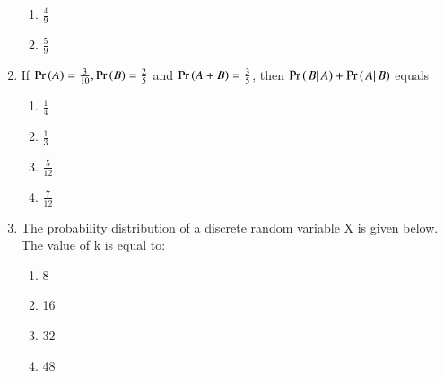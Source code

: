 \begin{enumerate}[label=\thesection.\arabic*,ref=\thesection.\theenumi]
\begin{enumerate}[label=(\alph*)]
\item $\frac{4}{9}$
\item $\frac{5}{9}$
\end{enumerate}

\item If $\Pr\left(A\right) = \frac{3}{10}, \Pr\left(B\right) = \frac{2}{5}$ and $\Pr\left(A+B\right) = \frac{3}{5}$, then $\Pr\left(\left. B \right| A\right) + \Pr\left(\left. A \right| B\right) $ equals
\begin{enumerate}
	\item $\frac{1}{4}$ \vspace{2pt}
	\item $\frac{1}{3}$ \vspace {2pt}
	\item $\frac{5}{12}$ \vspace{2pt}
	\item $\frac{7}{12}$ \vspace{2pt}
\end{enumerate}

\item The probability distribution of a discrete random variable X is given below. The value of k is equal to:
\begin{table}[!ht]

\end{table}
\begin{enumerate}[label=(\alph*)]
\item 8
\item 16
\item 32
\item 48
\end{enumerate}

\end{enumerate}
